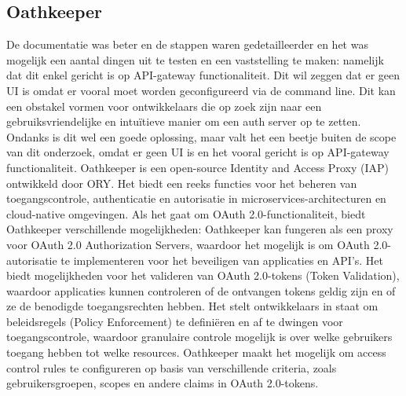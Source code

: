 \subsection{Oathkeeper}%
\label{subsec:oathkeeper}
De documentatie was beter en de stappen waren gedetailleerder en het was mogelijk een aantal dingen uit te testen en een vaststelling te maken: namelijk dat dit enkel gericht is op API-gateway functionaliteit. 
Dit wil zeggen dat er geen UI is omdat er vooral moet worden geconfigureerd via de command line. Dit kan een obstakel vormen voor ontwikkelaars die op zoek zijn naar een gebruiksvriendelijke en intuïtieve manier om een auth server op te zetten.
Ondanks is dit wel een goede oplossing, maar valt het een beetje buiten de scope van dit onderzoek, omdat er geen UI is en het vooral gericht is op API-gateway functionaliteit.
\newline
Oathkeeper is een open-source Identity and Access Proxy (IAP) ontwikkeld door ORY. Het biedt een reeks functies voor het beheren van toegangscontrole, authenticatie en autorisatie in microservices-architecturen en cloud-native omgevingen. Als het gaat om OAuth 2.0-functionaliteit, biedt Oathkeeper verschillende mogelijkheden:
Oathkeeper kan fungeren als een proxy voor OAuth 2.0 Authorization Servers, waardoor het mogelijk is om OAuth 2.0-autorisatie te implementeren voor het beveiligen van applicaties en API's.
Het biedt mogelijkheden voor het valideren van OAuth 2.0-tokens (Token Validation), waardoor applicaties kunnen controleren of de ontvangen tokens geldig zijn en of ze de benodigde toegangsrechten hebben.
Het stelt ontwikkelaars in staat om beleidsregels (Policy Enforcement) te definiëren en af te dwingen voor toegangscontrole, waardoor granulaire controle mogelijk is over welke gebruikers toegang hebben tot welke resources.
Oathkeeper maakt het mogelijk om access control rules te configureren op basis van verschillende criteria, zoals gebruikersgroepen, scopes en andere claims in OAuth 2.0-tokens.
